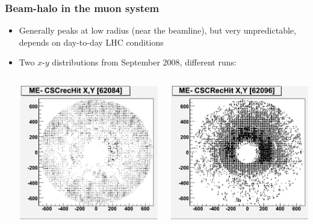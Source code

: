 \documentclass[compress]{beamer}
\begin{document}
\begin{frame}
\frametitle{Beam-halo in the muon system}

\begin{itemize}
\item Generally peaks at low radius (near the beamline), but very unpredictable, depends on day-to-day LHC conditions
\item Two $x$-$y$ distributions from September 2008, different runs:

\vspace{0.2 cm}
\begin{columns}
\includegraphics[width=\linewidth]{spot_62084.png}

\includegraphics[width=\linewidth]{spot_62096.png}
\end{columns}


\end{itemize}
\end{frame}
\end{document}
